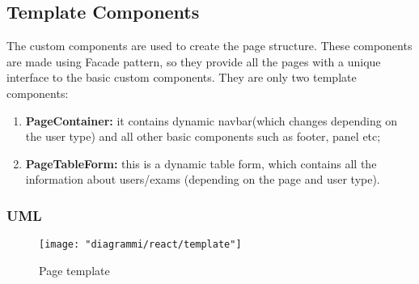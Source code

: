 \documentclass[../react]{subfiles}
\begin{document}
	\subsection{Template Components} The custom components are used to create the page structure. These components are made using Facade pattern, so 
	they provide all the pages with a unique interface to the basic custom components. They are only two template components: \begin{enumerate}
		\item \textbf{PageContainer: } it contains dynamic navbar(which changes depending on the user type) and all other basic components such as footer, panel etc;
		\item \textbf{PageTableForm: }this is a dynamic table form, which contains all the information about users/exams (depending on the page and user type).
	\end{enumerate} 
	\subsubsection{UML}
	\begin{figure}[h]
		\centering
		\texttt{[image: "diagrammi/react/template"]}
		\caption{Page template}
		\label{fig:Page template}
	\end{figure}
	
\end{document}
